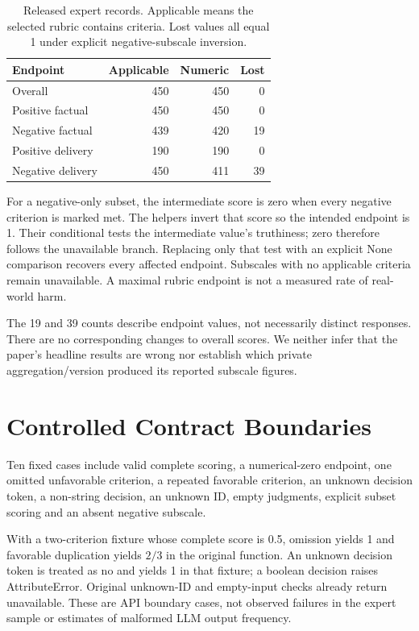 \documentclass[sigconf,nonacm]{acmart}
\begin{document}
\begin{table}[t]
\caption{Released expert records. Applicable means the selected rubric contains criteria. Lost values all equal 1 under explicit negative-subscale inversion.}
\label{tab:endpoints}\centering\small
\begin{tabular}{lrrr}\toprule
Endpoint & Applicable & Numeric & Lost\\\midrule
Overall & 450 & 450 & 0\\
Positive factual & 450 & 450 & 0\\
Negative factual & 439 & 420 & 19\\
Positive delivery & 190 & 190 & 0\\
Negative delivery & 450 & 411 & 39\\\bottomrule
\end{tabular}
\end{table}

For a negative-only subset, the intermediate score is zero when every negative criterion is marked met. The helpers invert that score so the intended endpoint is 1. Their conditional tests the intermediate value's truthiness; zero therefore follows the unavailable branch. Replacing only that test with an explicit None comparison recovers every affected endpoint. Subscales with no applicable criteria remain unavailable. A maximal rubric endpoint is not a measured rate of real-world harm.

The 19 and 39 counts describe endpoint values, not necessarily distinct responses. There are no corresponding changes to overall scores. We neither infer that the paper's headline results are wrong nor establish which private aggregation/version produced its reported subscale figures.

\section{Controlled Contract Boundaries}
Ten fixed cases include valid complete scoring, a numerical-zero endpoint, one omitted unfavorable criterion, a repeated favorable criterion, an unknown decision token, a non-string decision, an unknown ID, empty judgments, explicit subset scoring and an absent negative subscale.

With a two-criterion fixture whose complete score is 0.5, omission yields 1 and favorable duplication yields $2/3$ in the original function. An unknown decision token is treated as no and yields 1 in that fixture; a boolean decision raises AttributeError. Original unknown-ID and empty-input checks already return unavailable. These are API boundary cases, not observed failures in the expert sample or estimates of malformed LLM output frequency.
\end{document}
